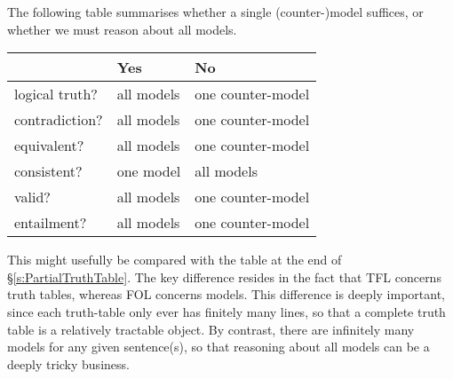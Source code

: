 The following table summarises whether a single (counter-)model suffices, or whether we must reason about all models.


\begin{center}
\begin{tabular}{l l l}
 & \textbf{Yes} & \textbf{No}\\
 \hline
logical truth? & all models & one counter-model\\
contradiction? &  all models  & one counter-model\\
equivalent? & all models & one counter-model\\
consistent? & one model & all models\\
valid? & all models & one counter-model\\
entailment? & all models & one counter-model\\
\end{tabular}
\end{center}
\label{table.ModelOrArgument}

This might usefully be compared with the table at the end of \S\ref{s:PartialTruthTable}. The key difference resides in the fact that TFL concerns truth tables, whereas FOL concerns models. This difference is deeply important, since each truth-table only ever has finitely many lines, so that a complete truth table is a relatively tractable object. By contrast, there are infinitely many models for any given sentence(s), so that reasoning about all models can be a deeply tricky business.
